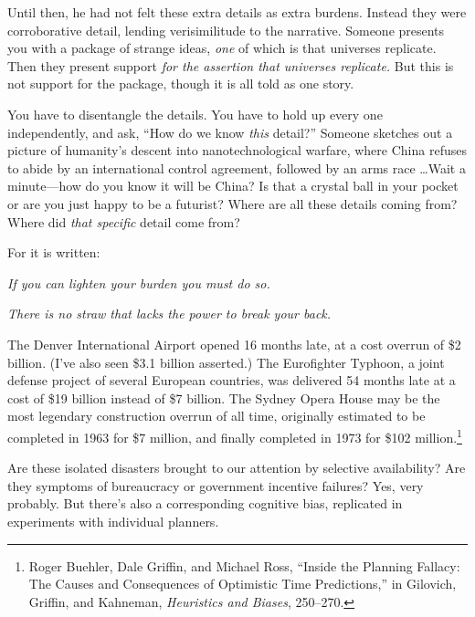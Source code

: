 {
 Until then, he had not felt these extra details as extra burdens.
Instead they were corroborative detail, lending verisimilitude to the
narrative. Someone presents you with a package of strange ideas,
\textit{one} of which is that universes replicate. Then they present
support \textit{for the assertion that universes replicate.} But this
is not support for the package, though it is all told as one story.}

{
 You have to disentangle the details. You have to hold up every one
independently, and ask, ``How do we know \textit{this}
detail?'' Someone sketches out a picture of
humanity's descent into nanotechnological warfare,
where China refuses to abide by an international control agreement,
followed by an arms race \ldots Wait a minute---how do you know it will
be China? Is that a crystal ball in your pocket or are you just happy
to be a futurist? Where are all these details coming from? Where did
\textit{that specific} detail come from?}

{
 For it is written:}

{
 \textit{If you can lighten your burden you must do so.}}

{
 \textit{There is no straw that lacks the power to break your
back.}}

\myendsectiontext


\bigskip


{
 The Denver International Airport opened 16 months late, at a cost
overrun of \$2 billion. (I've also seen \$3.1 billion
asserted.) The Eurofighter Typhoon, a joint defense project of several
European countries, was delivered 54 months late at a cost of \$19
billion instead of \$7 billion. The Sydney Opera House may be the most
legendary construction overrun of all time, originally estimated to be
completed in 1963 for \$7 million, and finally completed in 1973 for
\$102 million.\footnote{Roger Buehler, Dale Griffin, and Michael Ross,
``Inside the Planning Fallacy: The Causes and
Consequences of Optimistic Time Predictions,'' in
Gilovich, Griffin, and Kahneman, \textit{Heuristics and Biases},
250--270.} }

{
 Are these isolated disasters brought to our attention by selective
availability? Are they symptoms of bureaucracy or government incentive
failures? Yes, very probably. But there's also a
corresponding cognitive bias, replicated in experiments with individual
planners.}

